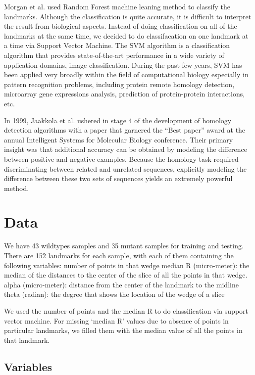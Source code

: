 \documentclass[10pt,letterpaper]{article}
\begin{document}
Morgan et al. used Random Forest machine leaning method to classify the
landmarks. Although the classification is quite accurate, it is
difficult to interpret the result from biological aspects. Instead of
doing classification on all of the landmarks at the same time, we
decided to do classifacation on one landmark at a time via Support
Vector Machine. The SVM algorithm is a classification algorithm that
provides state-of-the-art performance in a wide variety of application
domains, image classification. During the past few years, SVM has been
applied very broadly within the field of computational biology
especially in pattern recognition problems, including protein remote
homology detection, microarray gene expressions analysis, prediction of
protein-protein interactions, etc.

In 1999, Jaakkola et al. ushered in stage 4 of the development of
homology detection algorithms with a paper that garnered the ``Best
paper'' award at the annual Intelligent Systems for Molecular Biology
conference. Their primary insight was that additional accuracy can be
obtained by modeling the difference between positive and negative
examples. Because the homology task required discriminating between
related and unrelated sequences, explicitly modeling the difference
between these two sets of sequences yields an extremely powerful method.

\section{Data}\label{data}

We have 43 wildtypes samples and 35 mutant samples for training and
testing. There are 152 landmarks for each sample, with each of them
containing the following variables: number of points in that wedge
median R (micro-meter): the median of the distances to the center of the
slice of all the points in that wedge. alpha (micro-meter): distance
from the center of the landmark to the midline theta (radian): the
degree that shows the location of the wedge of a slice

We used the number of points and the median R to do classification via
support vector machine. For missing `median R' values due to absence of
points in particular landmarks, we filled them with the median value of
all the points in that landmark.

\subsection{Variables}\label{variables}
\end{document}
